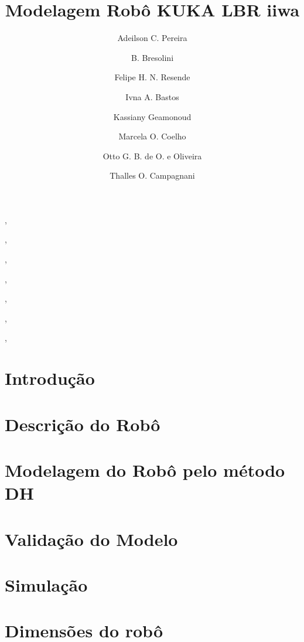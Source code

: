 \documentclass[a4paper]{ifacconf}
\begin{document}
\begin{frontmatter}

\title{Modelagem Robô KUKA LBR iiwa} 


\author[First]{Adeilson C. Pereira},
\author[First]{B. Bresolini},
\author[First]{Felipe H. N. Resende},
\author[First]{Ivna A. Bastos},
\author[First]{Kassiany Geamonoud},
\author[First]{Marcela O. Coelho},
\author[First]{Otto G. B. de O. e Oliveira},
\author[First]{Thalles O. Campagnani}


\address[First]{Centro Federal de Educação Tecnológica de Minas Gerais, Divinópolis - MG.}

\end{frontmatter}

\section{Introdução}

\section{Descrição do Robô}

\section{Modelagem do Robô pelo método DH}

\section{Validação do Modelo}

\section{Simulação}





\appendix
\onecolumn

\section{Dimensões do robô}\label{apend:dim}
\end{document}
